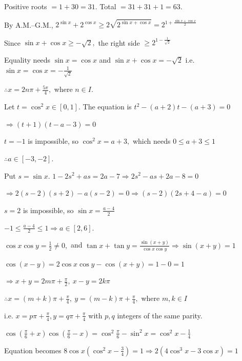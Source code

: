   Positive roots $= 1 + 30 = 31.$ Total $= 31 + 31 + 1 = 63.$

\item By A.M.--G.M., $2^{\sin x} + 2^{\cos x}\geq 2\sqrt{2^{\sin x + \cos x}} = 2^{1 + \frac{\sin x + \cos x}{2}}$

  Since $\sin x + \cos x\geq -\sqrt{2},$ the right side $\geq 2^{1 - \frac{1}{\sqrt{2}}}$

  Equality needs $\sin x = \cos x$ and $\sin x + \cos x = -\sqrt{2}$ i.e. $\sin x = \cos x = -\frac{1}{\sqrt{2}}$

  $\therefore x = 2n\pi + \frac{5\pi}{4},$ where $n\in I.$

\item Let $t = \cos^2x\in[0, 1].$ The equation is $t^2 - (a + 2)t - (a + 3) = 0$

  $\Rightarrow (t + 1)(t - a - 3) = 0$

  $t = -1$ is impossible, so $\cos^2x = a + 3,$ which needs $0\leq a + 3\leq 1$

  $\therefore a\in[-3, -2].$

\item Put $s = \sin x.$ $1 - 2s^2 + as = 2a - 7 \Rightarrow 2s^2 - as + 2a - 8 = 0$

  $\Rightarrow 2(s - 2)(s + 2) - a(s - 2) = 0 \Rightarrow (s - 2)(2s + 4 - a) = 0$

  $s = 2$ is impossible, so $\sin x = \frac{a - 4}{2}$

  $-1\leq\frac{a - 4}{2}\leq 1 \Rightarrow a\in[2, 6].$

\item $\cos x\cos y = \frac{1}{2}\neq 0,$ and $\tan x + \tan y = \frac{\sin(x + y)}{\cos x\cos y}\Rightarrow \sin(x + y) = 1$

  $\cos(x - y) = 2\cos x\cos y - \cos(x + y) = 1 - 0 = 1$

  $\Rightarrow x + y = 2m\pi + \frac{\pi}{2},~x - y = 2k\pi$

  $\therefore x = (m + k)\pi + \frac{\pi}{4},~y = (m - k)\pi + \frac{\pi}{4},$ where $m, k\in I$

  i.e. $x = p\pi + \frac{\pi}{4}, y = q\pi + \frac{\pi}{4}$ with $p, q$ integers of the same parity.

\item $\cos\left(\frac{\pi}{6} + x\right)\cos\left(\frac{\pi}{6} - x\right) = \cos^2\frac{\pi}{6} - \sin^2x = \cos^2x -
  \frac{1}{4}$

  Equation becomes $8\cos x\left(\cos^2x - \frac{3}{4}\right) = 1 \Rightarrow 2(4\cos^3x - 3\cos x) = 1$

